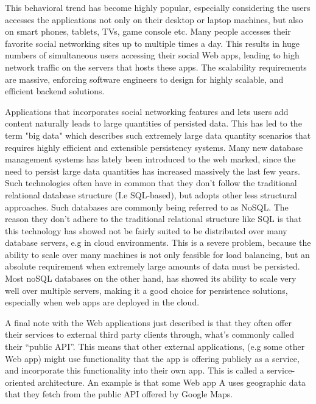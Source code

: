 This behavioral trend has become highly popular, especially considering the users accesses the applications not only on their desktop or laptop machines, but also on smart phones, tablets, TVs, game console etc. Many people accesses their favorite social networking sites up to multiple times a day. This results in huge numbers of simultaneous users accessing their social Web apps, leading to high network traffic on the servers that hosts these apps. The scalability requirements are massive, enforcing software engineers to design for highly scalable, and efficient backend solutions.

Applications that incorporates social networking features and lets users add content naturally leads to large quantities of persisted data. This has led to the term "big data" \cite{bigdata} which describes such extremely large data quantity scenarios that requires highly efficient and extensible persistency systems. Many new database management systems has lately been introduced to the web marked, since the need to persist large data quantities has increased massively the last few years. Such technologies often have in common that they don't follow the traditional relational database structure (I.e SQL-based), but adopts other less structural approaches. Such databases are commonly being referred to as NoSQL.\cite{nosql} The reason they don't adhere to the traditional relational structure like SQL is that this technology has showed not be fairly suited to be distributed over many database servers, e.g in cloud environments. \cite{cloudmanagement} This is a severe problem, because the ability to scale over many machines is not only feasible for load balancing, but an absolute requirement when extremely large amounts of data must be persisted. Most noSQL databases on the other hand, has showed its ability to scale very well over multiple servers, making it a good choice for persistence solutions, especially when web apps are deployed in the cloud. 

A final note with the Web applications just described is that they often offer their services to external third party clients through, what's commonly called their ``public API''. This means that other external applications, (e.g some other Web app) might use functionality that the app is offering publicly as a service, and incorporate this functionality into their own app. This is called a service-oriented architecture.\cite{soa} An example is that some Web app A uses geographic data that they fetch from the public API offered by Google Maps.\cite{googlemaps} 

